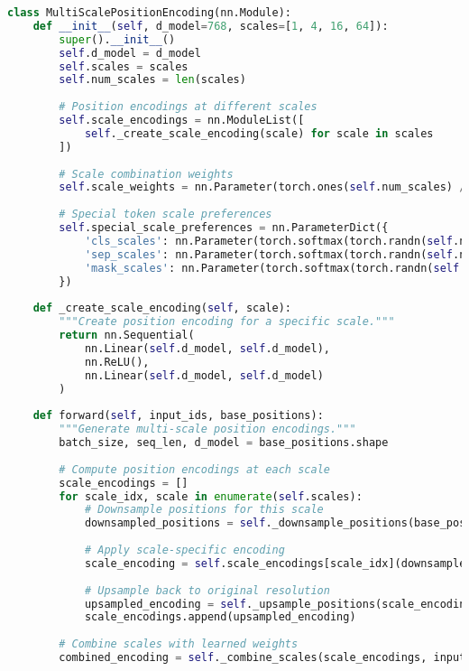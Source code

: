 \begin{lstlisting}[language=Python, caption=Multi-scale position encoding for hierarchical processing]
class MultiScalePositionEncoding(nn.Module):
    def __init__(self, d_model=768, scales=[1, 4, 16, 64]):
        super().__init__()
        self.d_model = d_model
        self.scales = scales
        self.num_scales = len(scales)
        
        # Position encodings at different scales
        self.scale_encodings = nn.ModuleList([
            self._create_scale_encoding(scale) for scale in scales
        ])
        
        # Scale combination weights
        self.scale_weights = nn.Parameter(torch.ones(self.num_scales) / self.num_scales)
        
        # Special token scale preferences
        self.special_scale_preferences = nn.ParameterDict({
            'cls_scales': nn.Parameter(torch.softmax(torch.randn(self.num_scales), dim=0)),
            'sep_scales': nn.Parameter(torch.softmax(torch.randn(self.num_scales), dim=0)),
            'mask_scales': nn.Parameter(torch.softmax(torch.randn(self.num_scales), dim=0))
        })
        
    def _create_scale_encoding(self, scale):
        """Create position encoding for a specific scale."""
        return nn.Sequential(
            nn.Linear(self.d_model, self.d_model),
            nn.ReLU(),
            nn.Linear(self.d_model, self.d_model)
        )
        
    def forward(self, input_ids, base_positions):
        """Generate multi-scale position encodings."""
        batch_size, seq_len, d_model = base_positions.shape
        
        # Compute position encodings at each scale
        scale_encodings = []
        for scale_idx, scale in enumerate(self.scales):
            # Downsample positions for this scale
            downsampled_positions = self._downsample_positions(base_positions, scale)
            
            # Apply scale-specific encoding
            scale_encoding = self.scale_encodings[scale_idx](downsampled_positions)
            
            # Upsample back to original resolution
            upsampled_encoding = self._upsample_positions(scale_encoding, scale, seq_len)
            scale_encodings.append(upsampled_encoding)
            
        # Combine scales with learned weights
        combined_encoding = self._combine_scales(scale_encodings, input_ids)
        

\end{lstlisting}
